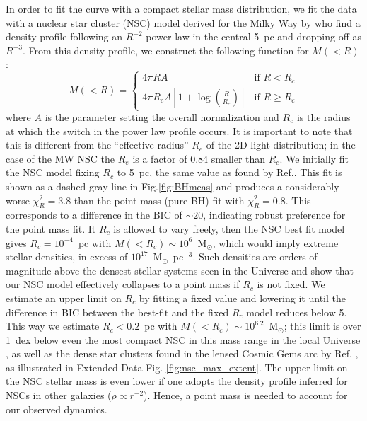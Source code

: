 \documentclass[twocolumn, fleqn]{doc_class}
\begin{document}
In order to fit the curve with a compact stellar mass distribution, we fit the data with a nuclear star cluster (NSC) model derived for the Milky Way by  who find a density profile following an $R^{-2}$ power law in the central 5~pc and dropping off as $R^{-3}$. From this density profile, we construct the following function for $M(<R)$:
\begin{equation}
    M(<R) = \begin{cases}
    4\pi RA & \text{if } R<R_c\\
    4\pi R_cA\left[1 + \log{\left(\frac{R}{R_c}\right)}\right] & \text{if } R \geq R_c
    \end{cases}
\end{equation}
where  $A$ is the parameter setting the overall normalization and $R_c$ is the radius at which the switch in the power law profile occurs. It is important to note that this is different from the ``effective radius'' $R_e$
of the 2D light distribution; in the case of the MW NSC the $R_e$ is a factor of 0.84 smaller than $R_c$.   We initially fit the NSC model fixing $R_c$ to 5~pc, the same value as found by Ref.. This fit is shown as a dashed gray line in Fig.\ref{fig:BHmeas} and produces a considerably worse $\chi^2_{R} = 3.8$ than the point-mass (pure BH) fit with $\chi^2_{R} = 0.8$. This corresponds to a difference in the BIC of $\sim 20$, indicating robust preference for the point mass fit. It $R_c$ is allowed to vary freely, then the NSC best fit model gives $R_c = 10^{-4}$~pc with $M(<R_c) \sim 10^6$~M$_{\odot}$, which would imply extreme stellar densities, in excess of $10^{17}$~M$_{\odot}$~pc$^{-3}$. Such densities are orders of magnitude above the densest stellar systems seen in the Universe and show that our NSC model effectively collapses to a point mass if $R_c$ is not fixed. We estimate an upper limit on $R_c$ by fitting a fixed value and lowering it until the difference in BIC between the best-fit and the fixed $R_c$ model reduces below 5. This way we estimate $R_c < 0.2$~pc with $M(<R_c) \sim 10^{6.2}$~M$_{\odot}$; this limit is over 1~dex below even the most compact NSC in this mass range in the local Universe , as well as the dense star clusters found in the lensed Cosmic Gems arc by Ref. , as illustrated in Extended Data Fig. \ref{fig:nsc_max_extent}. The upper limit on the NSC stellar mass is even lower if one adopts the density profile inferred for NSCs in other galaxies ($\rho \propto r^{-2}$). Hence, a point mass is needed to account for our observed dynamics.
\end{document}
